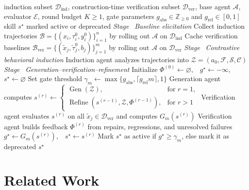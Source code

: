 \documentclass{article}
\newcommand*\circledblue[1]{\tikz[baseline=(char.base)]{
            \node[shape=circle,draw=NavyBlue!100,fill=NavyBlue!10,thick,inner sep=1pt] (char) {\scriptsize\textsf#1};}}
\begin{document}
\begin{algorithm}[h]
\caption{\textsc{SkillGen}: contrastive induction with generation-verification-refinement loop}
\label{alg:skillgen-loop}
\begin{algorithmic}[1]
\Require induction subset $\mathcal{D}_{\mathrm{ind}}$, construction-time verification subset $\mathcal{D}_{\mathrm{ver}}$, base agent $\mathcal{A}$, evaluator $\mathcal{E}$, round budget $K\ge1$, gate parameters $g_{\mathrm{abs}}\in\mathbb{Z}_{\ge0}$ and $g_{\mathrm{rel}}\in[0,1]$
\Ensure skill $s^{\star}$ marked $\mathrm{active}$ or $\mathrm{deprecated}$
\Statex \emph{Stage \circledblue{1}}\ \textit{Baseline elicitation}
\State Collect induction trajectories $\mathcal{B}=\{(x_i,\tau_i^{0},y_i^{0})\}_{i=1}^{n}$ by rolling out $\mathcal{A}$ on $\mathcal{D}_{\mathrm{ind}}$
\State Cache verification baselines $\mathcal{B}_{\mathrm{ver}}=\{(\tilde{x}_j,\tilde{\tau}^{0}_{j},b_j)\}_{j=1}^{m}$ by rolling out $\mathcal{A}$ on $\mathcal{D}_{\mathrm{ver}}$
\Statex \emph{Stage \circledblue{2}}\ \textit{Contrastive behavioral induction}
\State Induction agent analyzes trajectories into $\mathcal{Z}=(a_0,\mathcal{F},\mathcal{S},\mathcal{C})$
\Statex \emph{Stage \circledblue{3}}\ \textit{Generation--verification--refinement}
\State Initialize $\Phi^{(0)}\gets\varnothing$,\ \ $g^{\star}\gets-\infty$,\ \ $s^{\star}\gets\varnothing$
\State Set gate threshold $\gamma_m\gets\max\{g_{\mathrm{abs}},\lceil g_{\mathrm{rel}}m\rceil,1\}$
    \State Generation agent computes $s^{(r)}\gets
           \begin{cases}
               \operatorname{Gen}(\mathcal{Z}), & \text{for } r=1,\\
               \operatorname{Refine}(s^{(r-1)},\mathcal{Z},\Phi^{(r-1)}), & \text{for }  r>1
           \end{cases}$
    \State Verification agent evaluates $s^{(r)}$ on all $\tilde{x}_j\in\mathcal{D}_{\mathrm{ver}}$ and computes $G_m(s^{(r)})$
    \State Verification agent builds feedback $\Phi^{(r)}$ from repairs, regressions, and unresolved failures
        \State $g^{\star}\gets G_m(s^{(r)})$,\ \ $s^{\star}\gets s^{(r)}$
    \EndIf
\EndFor
\State Mark $s^{\star}$ as $\mathrm{active}$ if $g^{\star}\ge\gamma_m$, else mark it as $\mathrm{deprecated}$
\State \Return $s^{\star}$
\end{algorithmic}
\end{algorithm}


\newpage


\section{Related Work}
\label{sec:related_work}
\end{document}
